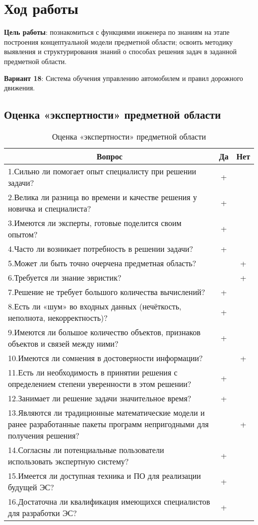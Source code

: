 \chapter{Ход работы}

\textbf{Цель работы}: познакомиться с функциями инженера по знаниям на этапе
построения концептуальной модели предметной области; освоить методику
выявления и структурирования знаний о способах решения задач в заданной
предметной области.

\textbf{Вариант 18}: Система обучения управлению автомобилем и правил дорожного
движения.

\section{Оценка «экспертности» предметной области}

\begin{table}[p]
\caption{Оценка «экспертности» предметной области}
\begin{tabularx}{\linewidth}{|X|c|c|} \hline
	\multicolumn{1}{|c|}{Вопрос} &
	\multicolumn{1}{c|}{Да} &
	\multicolumn{1}{c|}{Нет} \\ \hline
	
	1.Сильно ли помогает опыт специалисту при решении задачи?	& + & \\ \hline
	2.Велика ли разница во времени и качестве решения у новичка и специалиста?	& + & \\ \hline
	3.Имеются ли эксперты, готовые поделится своим опытом?	& + & \\ \hline
	4.Часто ли возникает потребность в решении задачи?	& + & \\ \hline
	5.Может ли быть точно очерчена предметная область?	& 	& + \\ \hline
	6.Требуется ли знание эвристик?	& 	& + \\ \hline
	7.Решение не требует большого количества вычислений?	& + & \\ \hline
	8.Есть ли «шум» во входных данных (нечёткость, неполнота, некорректность)?	& + & \\ \hline
	9.Имеются ли большое количество объектов, признаков объектов и связей между ними?	& + & \\ \hline
	10.Имеются ли сомнения в достоверности информации?	& 	& + \\ \hline
	11.Есть ли необходимость в принятии решения с определением степени уверенности в этом решении?	& + & \\ \hline
	12.Занимает ли решение задачи значительное время?	& + & \\ \hline
	13.Являются ли традиционные математические модели и ранее разработанные пакеты программ непригодными для получения решения?	& 	& + \\ \hline
	14.Согласны ли потенциальные пользователи использовать экспертную систему?	& + & \\ \hline
	15.Имеется ли доступная техника и ПО для реализации будущей ЭС?	& + & \\ \hline
	16.Достаточна ли квалификация имеющихся специалистов для разработки ЭС?	& + & \\ \hline
\end{tabularx}
\end{table}

